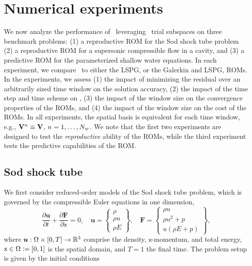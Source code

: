 \section{Numerical experiments}\label{sec:numerical_experiments}
We now analyze the performance of \methodAcronymROMs\ leveraging \spatialAcronym\ trial subspaces on three benchmark problems: (1) a reproductive ROM for the Sod shock tube problem (2) a reproductive ROM for a supersonic compressible flow in a cavity, and (3) a predictive ROM for the parameterized shallow water equations. In each experiment, we compare \methodAcronymROMs\ to either the LSPG, or the Galerkin and LSPG, ROMs. In the experiments, we assess (1) the impact of minimizing the residual over an arbitrarily sized time window on the solution accuracy, (2) the impact of the time step and time scheme on \methodAcronym, (3) the impact of the window size on the convergence properties of the ROMs, and (4) the impact of the window size on the cost of the ROMs. In all experiments, the spatial basis is equivalent for each time window, e.g., $\mathbf {V}^{n} \equiv \mathbf {V}$, $n=1,\ldots,N_w$. We note that the first two experiments are designed to test the \textit{reproductive} ability of the ROMs, while the third experiment tests the predictive capabilities of the ROM. 
 
\subsection{Sod shock tube}
We first consider reduced-order models of the Sod shock tube problem, which is governed by the compressible Euler equations in one dimension, 
\begin{equation}\label{eq:euler_1D}
    \frac{\partial \boldsymbol u}{\partial t} + \frac{\partial \boldsymbol F}{\partial \mathsf{x}} = 0, \quad
    \boldsymbol u= 
    \begin{Bmatrix} \rho \\ \rho u \\ \rho E \end{Bmatrix}, \quad 
    \boldsymbol F = \begin{Bmatrix} \rho u \\ \rho u^2 + p \\  u(\rho E + p) \end{Bmatrix},
\end{equation}
where $\boldsymbol u : \Omega \times [0,T] \rightarrow \mathbb{R}^{3}$ comprise the density, $\mathsf{x}$-momentum, and total energy, $\mathsf{x} \in \Omega \vcentcolon=  [0,1]$ is the spatial domain, and 
$T = 1$ the final time. 
The problem setup is given by the initial conditions

